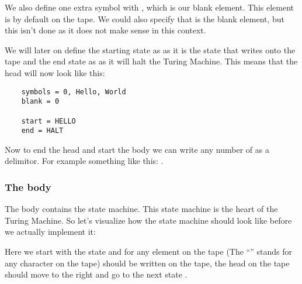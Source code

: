 We also define one extra symbol with , which is our blank element. This element is by default on the tape. 
We could also specify that  is the blank element, but this isn't done as it does not make sense in this context.

We will later on define the starting state as  as it is the state that writes  onto the tape 
and the end state as  as it will halt the Turing Machine. This means that the head will now look like this:
\begin{verbatim}
    symbols = 0, Hello, World
    blank = 0
    
    start = HELLO
    end = HALT
\end{verbatim}

Now to end the head and start the body we can write any number of \code{-} as a delimitor. For example something like this: \code{----}.

\subsubsection{The body}
The body contains the state machine. This state machine is the heart of the Turing Machine. 
So let's visualize how the state machine should look like before we actually implement it:

\begin{center}
\end{center}

Here we start with the  state and for any element on the tape (The ``\code{\_}'' stands for any character on the tape) 
 should be written on the tape, the head on the tape should move to the right and go to the next state .

